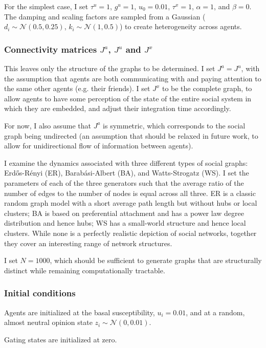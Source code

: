 \documentclass[]{article}
\begin{document}
For the simplest case, I set $\tau^u = 1$, $g^u = 1$, $u_0=0.01$, $\tau^x = 1$, $\alpha = 1$, and $\beta = 0$. The damping and scaling factors are sampled from a Gaussian ($d_i \sim \mathcal{N}(0.5,0.25)$, $k_i \sim \mathcal{N}(1,0.5)$) to create heterogeneity across agents.

\subsubsection{Connectivity matrices $J^a$, $J^u$ and $J^x$}

This leaves only the structure of the graphs to be determined. I set $J^a = J^u$, with the assumption that agents are both communicating with and paying attention to the same other agents (e.g. their friends). I set $J^x$ to be the complete graph, to allow agents to have some perception of the state of the entire social system in which they are embedded, and adjust their integration time accordingly.

For now, I also assume that $J^a$ is symmetric, which corresponds to the social graph being undirected (an assumption that should be relaxed in future work, to allow for unidirectional flow of information between agents).

I examine the dynamics associated with three different types of social graphs: Erdős-Rényi (ER), Barabási-Albert (BA), and Watts-Strogatz (WS). I set the parameters of each of the three generators such that the average ratio of the number of edges to the number of nodes is equal across all three. ER is a classic random graph model with a short average path length but without hubs or local clusters; BA is based on preferential attachment and has a power law degree distribution and hence hubs; WS has a small-world structure and hence local clusters. While none is a perfectly realistic depiction of social networks, together they cover an interesting range of network structures. 

I set $N = 1000$, which should be sufficient to generate graphs that are structurally distinct while remaining computationally tractable. 

\subsubsection{Initial conditions}
Agents are initialized at the basal susceptibility, $u_i = 0.01$, and at a random, almost neutral opinion state $z_i \sim \mathcal{N}(0, 0.01)$.

Gating states are initialized at zero.
\end{document}
